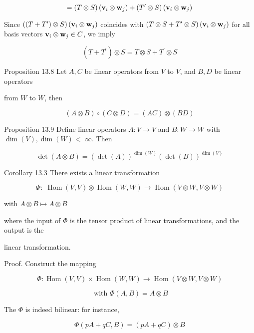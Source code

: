 \documentclass[11pt]{article}
\begin{document}
\[
= \left( {T \otimes  S}\right) \left( {{\bf v}_{i} \otimes  {\bf w}_{j}}\right)  + \left( {{T}^{\prime } \otimes  S}\right) \left( {{\bf v}_{i} \otimes  {\bf w}_{j}}\right)
\]

Since \(\left( {\left( {T + {T}^{\prime }}\right)  \otimes  S}\right) \left( {{\bf v}_{i} \otimes  {\bf w}_{j}}\right)\) coincides with \(\left( {T \otimes  S + {T}^{\prime } \otimes  S}\right) \left( {{\bf v}_{i} \otimes  {\bf w}_{j}}\right)\) for all basis vectors \({\bf v}_{i} \otimes  {\bf w}_{j} \in  C\), we imply

\[
\left( {T + {T}^{\prime }}\right)  \otimes  S = T \otimes  S + {T}^{\prime } \otimes  S
\]

Proposition 13.8 Let \(A,C\) be linear operators from \(V\) to \(V\), and \(B,D\) be linear operators

from \(W\) to \(W\), then

\[
\left( {A \otimes  B}\right)  \circ  \left( {C \otimes  D}\right)  = \left( {AC}\right)  \otimes  \left( {BD}\right)
\]

Proposition 13.9 Define linear operators \(A : V \rightarrow  V\) and \(B : W \rightarrow  W\) with \(\dim \left( V\right) ,\dim \left( W\right)  <\)  \(\infty\). Then

\[
\det \left( {A \otimes  B}\right)  = {\left( \det \left( A\right) \right) }^{\dim \left( W\right) }{\left( \det \left( B\right) \right) }^{\dim \left( V\right) }
\]

Corollary 13.3 There exists a linear transformation

\[
\Phi  : \;\operatorname{Hom}\left( {V,V}\right)  \otimes  \operatorname{Hom}\left( {W,W}\right)  \rightarrow  \operatorname{Hom}\left( {V \otimes  W,V \otimes  W}\right)
\]

with \(A \otimes  B \mapsto  A \otimes  B\)

where the input of \(\Phi\) is the tensor product of linear transformations, and the output is the

linear transformation.

Proof. Construct the mapping

\[
\Phi  : \operatorname{Hom}\left( {V,V}\right)  \times  \operatorname{Hom}\left( {W,W}\right)  \rightarrow  \operatorname{Hom}\left( {V \otimes  W,V \otimes  W}\right)
\]

\[
\text{ with }\Phi \left( {A,B}\right)  = A \otimes  B
\]

The \(\Phi\) is indeed bilinear: for instance,

\[
\Phi \left( {{pA} + {qC},B}\right)  = \left( {{pA} + {qC}}\right)  \otimes  B
\]
\end{document}
